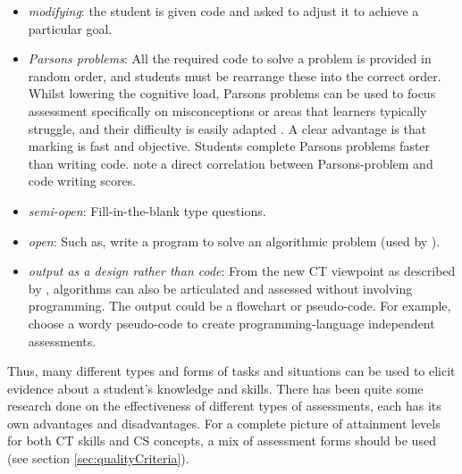 \begin{itemize}
\item \emph{modifying}: the student is given code and asked to adjust it to achieve a particular goal.
\item \emph{Parsons problems}: All the required code to solve a problem is provided in random order, and students must be rearrange these into the correct order. Whilst lowering the cognitive load, Parsons problems can be used to focus assessment specifically on misconceptions or areas that learners typically struggle, and their difficulty is easily adapted \cite{ericson2017parsons}. A clear advantage is that marking is fast and objective. Students complete Parsons problems faster than writing code.  note a direct correlation between Parsons-problem and code writing scores.
\item \emph{semi-open}: Fill-in-the-blank type questions. 
\item \emph{open}: Such as, write a program to solve an algorithmic problem (used by ).
 
\item \emph{output as a design rather than code}: From the new CT viewpoint as described by , algorithms can also be articulated and assessed without involving programming. The output could be a flowchart \cite{Smetsers2017} or pseudo-code. For example,  choose a wordy pseudo-code to create programming-language independent assessments.
    
\end{itemize}






Thus, many different types and forms of tasks and situations can be used to elicit evidence about a student's knowledge and skills. There has been quite some research done on the effectiveness of different types of assessments, each has its own advantages and disadvantages. For a complete picture of attainment levels for both CT skills and CS concepts, a mix of assessment forms should be used (see section \ref{sec:qualityCriteria}).


